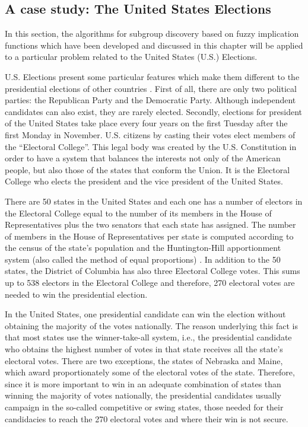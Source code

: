 \newpage

\subsection{A case study: The United States Elections}\label{subsection:acasestudy}

In this section, the algorithms for subgroup discovery based on fuzzy implication functions which have been developed and discussed in this chapter will be applied to a particular problem related to the United States (U.S.) Elections. 

U.S. Elections present some particular features which make them different to the presidential elections of other countries \cite{usagov}. First of all, there are only two political parties: the Republican Party and the Democratic Party. Although independent candidates can also exist, they are rarely elected. Secondly, elections for president of the United States take place every four years on the first Tuesday after the first Monday in November.  U.S. citizens by casting their votes elect members of the ``Electoral College''. This legal body was created by the U.S. Constitution in order to have a system that balances the interests not only of the American people, but also those of the states that conform the Union. It is the Electoral College who elects the president and the vice president of the United States. 

There are 50 states in the United States and each one has a number of electors in the Electoral College equal to the number of its members in the House of Representatives plus the two senators that each state has assigned. The number of members in the House of Representatives per state is computed according to the census of the state's population and the Huntington-Hill apportionment system (also called the method of equal proportions) \cite{censusgovApp}. In addition to the 50 states, the District of Columbia has also three Electoral College votes. This sums up to 538 electors in the Electoral College and therefore, 270 electoral votes are needed to win the presidential election. 

In the United States, one presidential candidate can win the election without obtaining the majority of the votes nationally. The reason underlying this fact is that most states use the winner-take-all system, i.e., the presidential candidate who obtains the highest number of votes in that state receives all the state's electoral votes. There are two exceptions, the states of Nebraska and Maine, which award proportionately some of the electoral votes of the state. Therefore, since it is more important to win in an adequate combination of states than winning the majority of votes nationally, the presidential candidates usually campaign in the so-called competitive or swing states, those needed for their candidacies to reach the 270 electoral votes and where their win is not secure.

